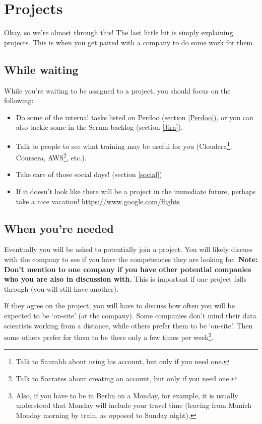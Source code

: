 \documentclass[11pt]{report}
\begin{document}
\section{Projects}
\label{Projects}
Okay, so we're almost through this! The last little bit is simply explaining projects. This is when you get paired with a company to do some work for them.

\subsection{While waiting}
While you're waiting to be assigned to a project, you should focus on the following:
\begin{itemize}
\item Do some of the internal tasks listed on Perdoo (section \ref{Perdoo}), or you can also tackle some in the Scrum backlog (section \ref{Jira}).
\item Talk to people to see what training may be useful for you (Cloudera\footnote{Talk to Saurabh about using his account, but only if you need one.}, Coursera, AWS\footnote{Talk to Socrates about creating an account, but only if you need one.}, etc.).
\item Take care of those social days! (section \ref{social})
\item If it doesn't look like there will be a project in the immediate future, perhaps take a nice vacation!
\href{https://www.google.com/flights}{https://www.google.com/flights}
\end{itemize}

\subsection{When you're needed}
\label{when you're needed}
Eventually you will be asked to potentially join a project. You will likely discuss with the company to see if you have the competencies they are looking for. \textbf{Note: Don't mention to one company if you have other potential companies who you are also in discussion with.} This is important if one project falls through (you will still have another).

If they agree on the project, you will have to discuss how often you will be expected to be `on-site' (at the company). Some companies don't mind their data scientists working from a distance, while others prefer them to be `on-site'. Then some others prefer for them to be there only a few times per week\footnote{Also, if you have to be in Berlin on a Monday, for example, it is usually understood that Monday will include your travel time (leaving from Munich Monday morning by train, as opposed to Sunday night).}.
\end{document}
